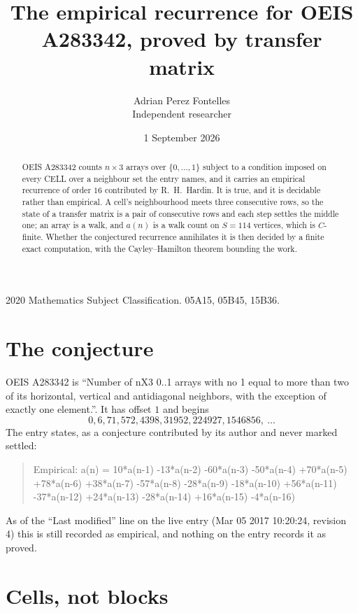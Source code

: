 \documentclass[11pt,a4paper]{article}
\title{The empirical recurrence for OEIS A283342, proved by transfer matrix}
\author{Adrian Perez Fontelles\\ \small Independent researcher}
\date{1 September 2026}
\theoremstyle{plain}
\theoremstyle{definition}
\begin{document}
\maketitle

\begin{abstract}
OEIS A283342 counts $n\times3$ arrays over $\{0,\dots,1\}$ subject to a condition imposed on
every CELL over a neighbour set the entry names, and it carries an empirical recurrence of
order $16$ contributed by R.~H.~Hardin. It is true, and it is decidable rather than
empirical. A cell's neighbourhood meets three consecutive rows, so the state of a transfer
matrix is a pair of consecutive rows and each step settles the middle one; an array is a
walk, and $a(n)$ is a walk count on $S=114$ vertices, which is $C$-finite. Whether the
conjectured recurrence annihilates it is then decided by a finite exact computation, with the
Cayley--Hamilton theorem bounding the work.
\end{abstract}

\noindent\small 2020 Mathematics Subject Classification. 05A15, 05B45, 15B36.\normalsize

\section{The conjecture}

OEIS A283342 is ``Number of nX3 0..1 arrays with no 1 equal to more than two of its horizontal, vertical and antidiagonal neighbors, with the exception of exactly one element.''. It has offset $1$ and begins
\[
0, 6, 71, 572, 4398, 31952, 224927, 1546856,\ \dots
\]
The entry states, as a conjecture contributed by its author and never marked settled:
\begin{quote}
Empirical: a(n) = 10*a(n-1) -13*a(n-2) -60*a(n-3) -50*a(n-4) +70*a(n-5) +78*a(n-6) +38*a(n-7) -57*a(n-8) -28*a(n-9) -18*a(n-10) +56*a(n-11) -37*a(n-12) +24*a(n-13) -28*a(n-14) +16*a(n-15) -4*a(n-16)
\end{quote}
As of the ``Last modified'' line on the live entry (Mar 05 2017 10:20:24, revision 4) this is still
recorded as empirical, and nothing on the entry records it as proved.

\section{Cells, not blocks}
\end{document}
